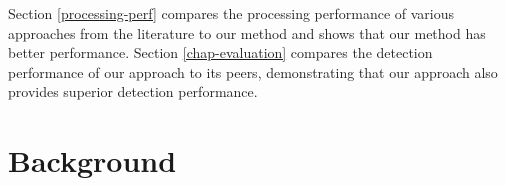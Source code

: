 \documentclass{llncs}
\begin{document}
Section \ref{processing-perf} compares the processing performance of
various approaches from the literature to our method and shows that
our method has better performance. Section \ref{chap-evaluation}
compares the detection performance of our approach to its peers,
demonstrating that
our approach also provides superior detection performance.


\section{Background}
\end{document}
